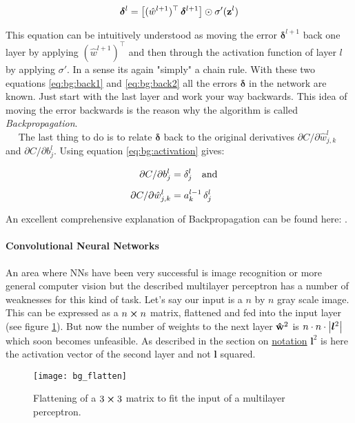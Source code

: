 \begin{equation} \label{eq:bg:back2}
    \boldsymbol \delta^l =
    \qty[(\hat w^{l+1})^\top \, \boldsymbol \delta^{l+1}]
    \odot \sigma'(\vb z^l)
\end{equation}

This equation can be intuitively understood as moving the error
$\boldsymbol \delta^{l+1}$ back one layer by applying $(\hat w^{l+1})^\top$ and then through the activation function of layer $l$ by applying $\sigma'$. In a sense its again "simply" a chain rule. With these two equations \eqref{eq:bg:back1} and \eqref{eq:bg:back2} all the errors $\boldsymbol \delta$ in the network are known. Just start with the last layer and work your way backwards. This idea of moving the error backwards is the reason why the algorithm is called \textit{Backpropagation}. \\


$\quad$ The last thing to do is to relate $\boldsymbol \delta$ back to the original derivatives $\partial C / \partial \hat w^l_{j,k}$ and $\partial C / \partial b^l_j$. Using equation \eqref{eq:bg:activation} gives:

\begin{align}
    \partial C / \partial b^l_j &= \delta^l_j \qq{and} \\[5pt]
    \partial C / \partial \hat w^l_{j,k} &= a^{l-1}_k \, \delta^l_j
\end{align}


An excellent comprehensive explanation of Backpropagation can be found here: \cite{backprop}.

\paragraph{Convolutional Neural Networks}
An area where NNs have been very successful is image recognition or more general computer vision but the described multilayer perceptron has a number of weaknesses for this kind of task. Let's say our input is a $n$ by $n$ gray scale image. This can be expressed as a $n \cp n$ matrix, flattened and fed into the input layer (see figure \ref{fig:bg:flatten}). But now the number of weights to the next layer $\vu{w}^2$ is $n \cdot n \cdot \qty| \boldsymbol l^2|$
which soon becomes unfeasible. As described in the section on \hyperref[sec:notation]{notation} $\boldsymbol l^2$ is here the activation vector of the second layer and not $\boldsymbol l$ squared.

\begin{figure}[H]
    \centering
    \texttt{[image: bg\_flatten]}
    \caption{Flattening of a $3\cp3$ matrix to fit the input of a multilayer perceptron.}
    \label{fig:bg:flatten}
\end{figure}

